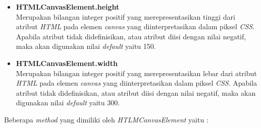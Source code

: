 \begin{itemize}
	\item \textbf{HTMLCanvasElement.height} \\ Merupakan bilangan integer positif yang merepresentasikan tinggi dari atribut \textit{HTML} pada elemen \textit{canvas} yang diinterpretasikan dalam piksel \textit{CSS}. Apabila atribut tidak didefinisikan, atau atribut diisi dengan nilai negatif, maka akan digunakan nilai \textit{default} yaitu 150.
	
	\item \textbf{HTMLCanvasElement.width} \\ Merupakan bilangan integer positif yang merepresentasikan lebar dari atribut \textit{HTML} pada elemen \textit{canvas} yang diinterpretasikan dalam piksel \textit{CSS}. Apabila atribut tidak didefinisikan, atau atribut diisi dengan nilai negatif, maka akan digunakan nilai \textit{default} yaitu 300.
\end{itemize}

Beberapa \textit{method} yang dimiliki oleh \textit{HTLMCanvasElement} yaitu : 

